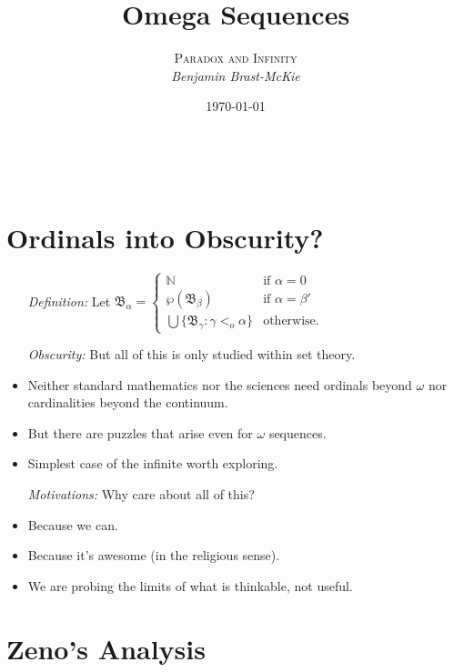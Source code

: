 \documentclass[a4paper, 11pt]{article} %
\title{\textbf{Omega Sequences}} %
\author{\textsc{Paradox and Infinity}\\ \em Benjamin Brast-McKie} %
\date{\today} %
\makeatletter
\newcommand{\set}[1]{\lbrace#1\rbrace} %
\newcommand{\N}{\mathbb{N}}
\newcommand{\B}{\mathfrak{B}}
\renewcommand{\maketitle}{ %
\begin{flushright} %
{\LARGE\@title} %

\vspace{10pt} %

{\@author} %
\\\@date %

\vspace{-30pt} %
\end{flushright}
}
\makeatother
\begin{document}
\maketitle %

\thispagestyle{empty}


\section*{Ordinals into Obscurity?}

\begin{itemize}
  \item[\it Definition:] Let $\B_\alpha = 
    \begin{cases}
      \N                                            & \text{if } \alpha = 0\\
      \wp(\B_\beta)                                 & \text{if } \alpha = \beta'\\
      \bigcup \set{ \B_\gamma : \gamma <_o \alpha } & \text{otherwise.} 
    \end{cases}$
  \item[\it Obscurity:] But all of this is only studied within set theory.
    \item Neither standard mathematics nor the sciences need ordinals beyond $\omega$ nor cardinalities beyond the continuum. 
    \item But there are puzzles that arise even for $\omega$ sequences. 
    \item Simplest case of the infinite worth exploring.
  \item[\it Motivations:] Why care about all of this?
    \item Because we can.
    \item Because it's awesome (in the religious sense).
    \item We are probing the limits of what is thinkable, not useful.
\end{itemize}



\section*{Zeno's Analysis}
\end{document}
